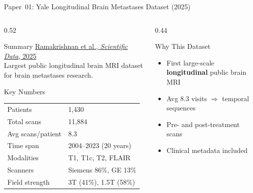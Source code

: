 \documentclass[aspectratio=169,xcolor=dvipsnames]{beamer}
\begin{document}
\begin{frame}{Paper~01: Yale Longitudinal Brain Metastases Dataset (2025)}
    \begin{columns}
        \begin{column}{0.52\textwidth}
            \begin{block}{Summary}
                \small
                \href{https://doi.org/10.1038/s41597-025-04360-7}{Ramakrishnan et al., \textit{Scientific Data}, 2025}\\[0.3em]
                Largest public longitudinal brain MRI dataset for brain metastases research.
            \end{block}

            \vspace{0.2em}

            \begin{block}{Key Numbers}
                \small
                \begin{tabular}{ll}
                    Patients & 1,430 \\
                    Total scans & 11,884 \\
                    Avg scans/patient & 8.3 \\
                    Time span & 2004--2023 (20 years) \\
                    Modalities & T1, T1c, T2, FLAIR \\
                    Scanners & Siemens 86\%, GE 13\% \\
                    Field strength & 3T (41\%), 1.5T (58\%) \\
                \end{tabular}
            \end{block}
        \end{column}

        \begin{column}{0.44\textwidth}
            \begin{block}{Why This Dataset}
                \small
                \begin{itemize}
                    \item First large-scale \textbf{longitudinal} public brain MRI
                    \item Avg 8.3 visits $\Rightarrow$ temporal sequences
                    \item Pre- and post-treatment scans
                    \item Clinical metadata included
                \end{itemize}
            \end{block}


\end{column}
\end{columns}
\end{frame}
\end{document}
